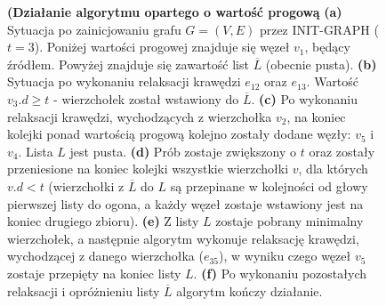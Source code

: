 \begin{figure}[!htbp]
\begin{subfigure}[b]{0.32\textwidth}
		\caption{}
	\end{subfigure}
	\caption{ \textbf{(Działanie algorytmu opartego o wartość progową} \textbf{(a)} Sytuacja po zainicjowaniu grafu $G = \left( V, E \right)$ przez \textsf{INIT-GRAPH} ($t=3$). Poniżej wartości progowej znajduje się węzeł $v_{1}$, będący źródłem. Powyżej znajduje się zawartość list $\overline{L}$ (obecnie pusta). \textbf{(b)} Sytuacja po wykonaniu relaksacji krawędzi $e_{12}$ oraz $e_{13}$. Wartość $v_{3}.d \geqslant t$ - wierzchołek został wstawiony do $\overline{L}$. \textbf{(c)} Po wykonaniu relaksacji krawędzi, wychodzących z wierzchołka $v_{2}$, na koniec kolejki ponad wartością progową kolejno zostały dodane węzły: $v_{5}$ i $v_{4}$. Lista $L$ jest pusta. \textbf{(d)} Prób zostaje zwiększony o $t$ oraz zostały przeniesione na koniec kolejki wszystkie wierzchołki $v$, dla których $v.d < t$ (wierzchołki z $\overline{L}$ do $L$ są przepinane w kolejności od głowy pierwszej listy do ogona, a każdy węzeł zostaje wstawiony jest na koniec drugiego zbioru). \textbf{(e)} Z listy $L$ zostaje pobrany minimalny wierzchołek, a następnie algorytm wykonuje relaksację krawędzi, wychodzącej z danego wierzchołka ($e_{35}$), w wyniku czego węzeł $v_{5}$ zostaje przepięty na koniec listy $L$. \textbf{(f)} Po wykonaniu pozostałych relaksacji i opróżnieniu listy $\overline{L}$ algorytm kończy działanie. } \label{fig:exampleThreshold}
\end{figure}